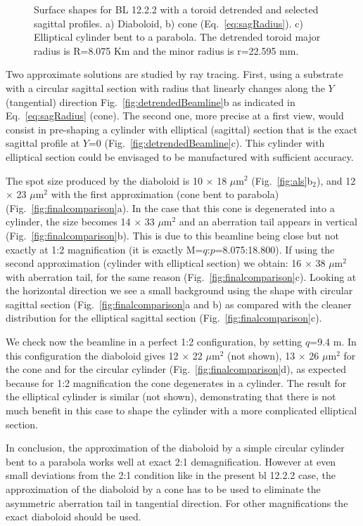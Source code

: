\documentclass{iucr}              %
\newcommand{\inred}[1]{{\color{red}#1}}
\begin{document}
\begin{figure}
\caption{Surface shapes for BL 12.2.2 with a toroid detrended and selected sagittal profiles.
a) Diaboloid, b) cone (Eq.~\ref{eq:sagRadius}). c) Elliptical cylinder bent to a parabola. The detrended toroid major radius is R=8.075 Km and the minor radius is  r=22.595 mm.
}
\end{figure}

Two approximate solutions are studied by ray tracing. First, using a substrate with a circular sagittal section with radius that linearly changes along the $Y$ (tangential) direction Fig.~\ref{fig:detrendedBeamline}b as indicated in Eq.~\ref{eq:sagRadius} (cone). The second one, more precise at a first view, would consist in pre-shaping a cylinder with elliptical (sagittal) section that is the exact sagittal profile at $Y$=0 (Fig.~\ref{fig:detrendedBeamline}c).  This cylinder with elliptical section could be envisaged to be manufactured with sufficient accuracy. 

The spot size produced by the diaboloid is 10 $\times$ 18 $\mu$m$^2$ (Fig.~\ref{fig:als}b$_2$), and 12 $\times$ 23 $\mu$m$^2$ with the first approximation (cone bent to parabola) (Fig.~\ref{fig:finalcomparison}a). In the case that this cone is degenerated into a cylinder, the size becomes 14 $\times$ 33 $\mu$m$^2$ and an aberration tail appears in vertical (Fig.~\ref{fig:finalcomparison}b). This is due to this beamline being close but not exactly at 1:2 magnification (it is exactly M=$q$:$p$=8.075:18.800). If using the second approximation (cylinder with elliptical section) we obtain: 16 $\times$ 38 $\mu$m$^2$ with aberration tail, for the same reason (Fig.~\ref{fig:finalcomparison}c). Looking at the horizontal direction we see a small background using the shape with circular sagittal section (Fig.~\ref{fig:finalcomparison}a and b) as compared with the cleaner distribution for the elliptical sagittal section (Fig.~\ref{fig:finalcomparison}c). 

We check now the beamline in a perfect 1:2 configuration, by setting $q$=9.4 m. In this configuration the diaboloid gives 12 $\times$ 22 $\mu$m$^2$ (not shown), 13 $\times$ 26 $\mu$m$^2$ for the cone and for the circular cylinder (Fig.~\ref{fig:finalcomparison}d), as expected because for 1:2 magnification the cone degenerates in a cylinder. The result for the elliptical cylinder is similar (not shown), demonstrating that there is not much benefit in this case to shape the cylinder with a more complicated elliptical section.   


In conclusion, \inred{the approximation of the diaboloid by a simple circular cylinder bent to a parabola works well at exact 2:1 demagnification. However at even small deviations from the 2:1 condition like in the present bl 12.2.2 case, the approximation of the diaboloid by a cone has to be used to eliminate the asymmetric aberration tail in tangential direction. For other magnifications the exact diaboloid should be used.}
\end{document}
